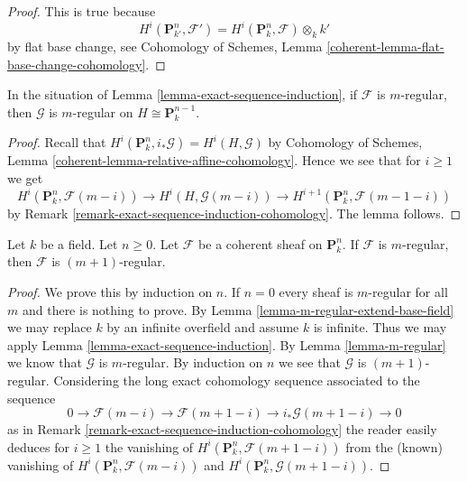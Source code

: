\begin{proof}
This is true because
$$
H^i(\mathbf{P}^n_{k'}, \mathcal{F}') =
H^i(\mathbf{P}^n_k, \mathcal{F}) \otimes_k k'
$$
by flat base change, see
Cohomology of Schemes, Lemma \ref{coherent-lemma-flat-base-change-cohomology}.
\end{proof}

\begin{lemma}
\label{lemma-m-regular}
In the situation of Lemma \ref{lemma-exact-sequence-induction},
if $\mathcal{F}$ is $m$-regular, then $\mathcal{G}$ is $m$-regular
on $H \cong \mathbf{P}^{n - 1}_k$.
\end{lemma}

\begin{proof}
Recall that $H^i(\mathbf{P}^n_k, i_*\mathcal{G}) = H^i(H, \mathcal{G})$ by
Cohomology of Schemes, Lemma \ref{coherent-lemma-relative-affine-cohomology}.
Hence we see that for $i \geq 1$ we get
$$
H^i(\mathbf{P}^n_k, \mathcal{F}(m - i)) \to
H^i(H, \mathcal{G}(m - i)) \to
H^{i + 1}(\mathbf{P}^n_k, \mathcal{F}(m - 1 - i))
$$
by Remark \ref{remark-exact-sequence-induction-cohomology}.
The lemma follows.
\end{proof}

\begin{lemma}
\label{lemma-m-regular-up}
Let $k$ be a field. Let $n \geq 0$.
Let $\mathcal{F}$ be a coherent sheaf on $\mathbf{P}^n_k$.
If $\mathcal{F}$ is $m$-regular, then $\mathcal{F}$ is
$(m + 1)$-regular.
\end{lemma}

\begin{proof}
We prove this by induction on $n$. If $n = 0$ every sheaf is $m$-regular
for all $m$ and there is nothing to prove. By
Lemma \ref{lemma-m-regular-extend-base-field} we may replace $k$
by an infinite overfield and assume $k$ is infinite.
Thus we may apply Lemma \ref{lemma-exact-sequence-induction}.
By Lemma \ref{lemma-m-regular} we know that $\mathcal{G}$ is
$m$-regular. By induction on $n$ we see that $\mathcal{G}$ is
$(m + 1)$-regular. Considering the long exact cohomology sequence
associated to the sequence
$$
0 \to \mathcal{F}(m - i) \to \mathcal{F}(m + 1 - i)
\to i_*\mathcal{G}(m + 1 - i) \to 0
$$
as in Remark \ref{remark-exact-sequence-induction-cohomology}
the reader easily deduces for $i \geq 1$ the vanishing of
$H^i(\mathbf{P}^n_k, \mathcal{F}(m + 1 - i))$ from the (known) vanishing of
$H^i(\mathbf{P}^n_k, \mathcal{F}(m - i))$ and
$H^i(\mathbf{P}^n_k, \mathcal{G}(m + 1 - i))$.
\end{proof}

